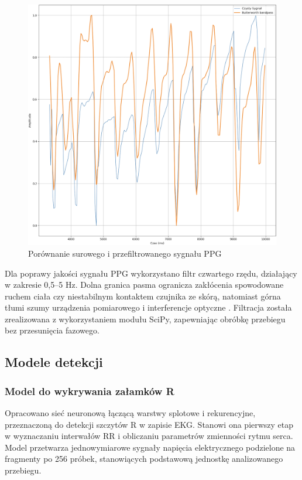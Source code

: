 \documentclass[journal]{IEEEtran}
\begin{document}
{\begin{figure}[htbp]
    \centering
    \includegraphics[width=0.76\linewidth]{Filtr_PPG.png} 
    \caption{Porównanie surowego i przefiltrowanego sygnału PPG}
    \label{fig:filtr_ppg}
\end{figure}

Dla poprawy jakości sygnału PPG wykorzystano filtr  czwartego rzędu, działający w zakresie 0,5–5 Hz. Dolna granica pasma ogranicza zakłócenia spowodowane ruchem ciała czy niestabilnym kontaktem czujnika ze skórą, natomiast górna tłumi szumy urządzenia pomiarowego i interferencje optyczne  \cite{26}. Filtracja została zrealizowana z wykorzystaniem  modułu SciPy, zapewniając obróbkę przebiegu bez przesunięcia fazowego.

\newpage
\subsection{Modele detekcji}
\subsubsection{Model do wykrywania załamków R}
Opracowano sieć neuronową łączącą warstwy splotowe i rekurencyjne, przeznaczoną do detekcji szczytów R w zapisie EKG. Stanowi ona pierwszy etap w wyznaczaniu interwałów RR i obliczaniu parametrów zmienności rytmu serca. Model przetwarza jednowymiarowe sygnały napięcia elektrycznego podzielone na fragmenty po 256 próbek, stanowiących podstawową jednostkę analizowanego przebiegu.

}
\end{document}
